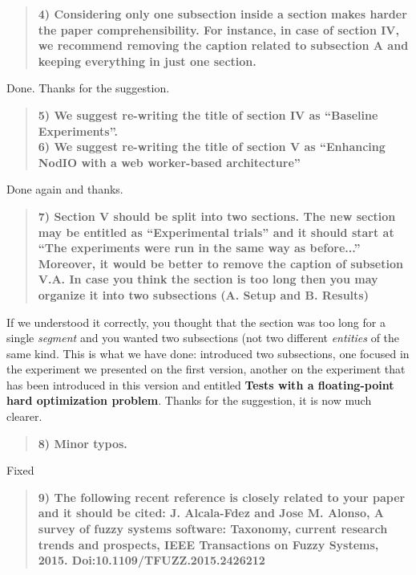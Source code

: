 \documentclass[preprint]{elsarticle}
\begin{document}
\begin{quote}
\textbf{4) Considering only one subsection inside a section makes harder the paper comprehensibility.
For instance, in case of section IV, we recommend removing the caption
related to subsection A and keeping everything in just one section.}
\end{quote}

Done. Thanks for the suggestion.

\begin{quote}
\textbf{ 5) We suggest re-writing the title of section IV as ``Baseline Experiments''.\\
6) We suggest re-writing the title of section V as ``Enhancing NodIO
with a web worker-based architecture''\\}
\end{quote}

Done again and thanks.

\begin{quote}
\textbf{7) Section V should be split into two sections.
The new section may be entitled as ``Experimental trials'' and it should start at ``The experiments were run in the same way as before...''
Moreover, it would be better to remove the caption of subsetion V.A.
In case you think the section is too long then you may organize it
into two subsections (A. Setup and B. Results)\\}
\end{quote}

If we understood it correctly, you thought that the section was too
long for a single {\em segment} and you wanted two subsections (not
two different {\em entities} of the same kind. This is what we have
done: introduced two subsections, one focused in the experiment we
presented on the first version, another on the experiment that
has been introduced in this version and entitled {\bf Tests with a
  floating-point hard optimization problem}. Thanks for the
suggestion, it is now much clearer.

\begin{quote}
\textbf{8) Minor typos.\\}
\end{quote}

Fixed

\begin{quote}
\textbf{9) The following recent reference is closely related to your paper and it should be cited:
J. Alcala-Fdez and Jose M. Alonso, A survey of fuzzy systems software: Taxonomy, current research trends and prospects, IEEE Transactions on Fuzzy Systems, 2015. Doi:10.1109/TFUZZ.2015.2426212}
\end{quote}
\end{document}
